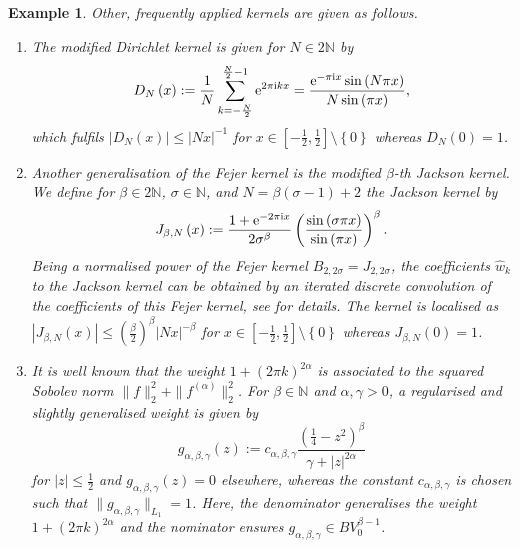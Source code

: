 \documentclass[11pt,a4paper,bibtotoc]{scrartcl}
\def\N{\mathbb{N}}
\def\ti{\mbox{\scriptsize{\rm i}}}
\newcommand{\eimp}[1]{{\rm e}^{- \pi{\ti} #1}}
\newcommand{\eip}[1]{{\rm e}^{ 2\pi{\ti} #1}}
\newcommand{\eim}[1]{{\rm e}^{-2\pi{\ti} #1}}
\newtheorem{example}[theorem]{Example}
\newenvironment{Example}{\goodbreak \begin{example}\rm}{\end{example}}
\numberwithin{equation}{section}
\numberwithin{table}{section}
\numberwithin{figure}{section}
\begin{document}
\begin{Example}\label{ex:kernels}
Other, frequently applied kernels are given as follows.
\begin{enumerate}
\item
  The modified {\em Dirichlet kernel} is given for $N\in 2\N$ by
  \begin{equation*} \label{eq:dirichlet}
    D_N\left(x\right):=\frac{1}{N}\sum\limits_{k=-\frac{N}{2}}^{\frac{N}{2}-1}
    \eip{kx}= \frac{\eimp{x} \sin\left(N\pi x\right)}{N\sin\left(\pi x\right)},
  \end{equation*}
  which fulfils $|D_N(x)|\le |Nx|^{-1}$ for
  $x\in\left[-\frac{1}{2},\frac{1}{2}\right] \setminus\left\{0\right\}$
  whereas $D_N(0)=1$.
\item
  Another generalisation of the Fejer kernel is the modified $\beta$-th
  {\em Jackson kernel}.
  We define for $\beta\in2\N$, $\sigma\in \N$, and $N=\beta(\sigma-1)+2$ the
  Jackson kernel by
  \begin{equation*}
    J_{\beta,N}\left(x\right):=\frac{1+\eim{x}}{2\sigma^{\beta}}
    \left(\frac{\sin\left(\sigma\pi x\right)}{\sin 
        \left(\pi x\right)}\right)^{\beta}.
  \end{equation*}
  Being a normalised power of the Fejer kernel $B_{2,2\sigma}=J_{2,2\sigma}$,
  the coefficients $\hat w_k$ to the Jackson kernel can be obtained by an
  iterated discrete convolution of the coefficients of this Fejer kernel, see
  \cite{Alekseev} for details.
  The kernel is localised as $|J_{\beta,N}(x)| \le (\frac{\beta}{2})^{\beta}
  |Nx|^{-\beta}$ for $x\in\left[-\frac{1}{2},\frac{1}{2}\right]
  \setminus\left\{0\right\}$ whereas $J_{\beta,N}\left(0\right)=1$.
\item
  It is well known that the weight $1+(2\pi k)^{2\alpha}$ is associated to the
  squared Sobolev norm $\|f\|_2^2+\|f^{(\alpha)}\|_2^2$.
  For $\beta\in\N$ and $\alpha,\gamma>0$, a regularised and slightly
  generalised weight is given by
  \begin{equation*}
    g_{\alpha,\beta,\gamma}\left(z\right):=c_{\alpha,\beta,\gamma}
    \frac{\left(\frac{1}{4}-z^2\right)^{\beta}}{\gamma+|z|^{2\alpha}}
  \end{equation*}
  for $|z|\le\frac{1}{2}$ and $g_{\alpha,\beta,\gamma}(z)=0$
  elsewhere, whereas the constant $c_{\alpha,\beta,\gamma}$ is chosen such
  that $\|g_{\alpha,\beta,\gamma}\|_{L_1}=1$.
  Here, the denominator generalises the weight $1+(2\pi k)^{2\alpha}$ and the
  nominator ensures $g_{\alpha,\beta,\gamma} \in BV^{\beta-1}_0$.

\end{enumerate}
\end{Example}
\end{document}
